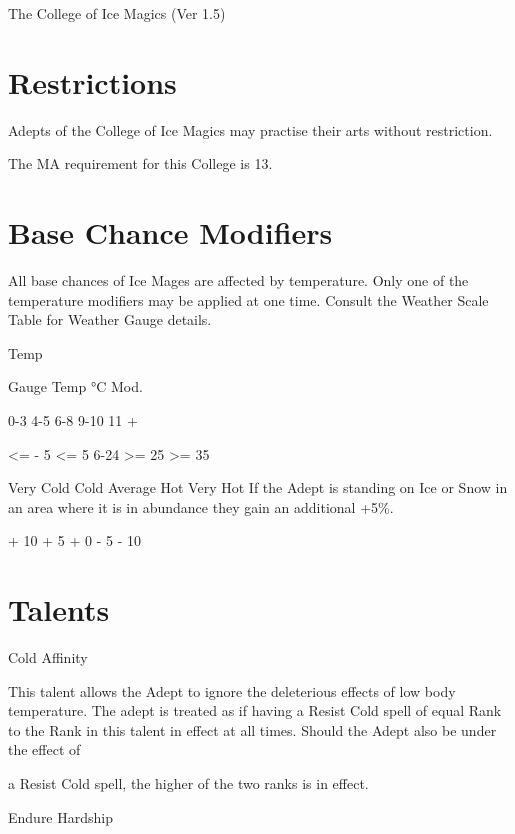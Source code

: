 \begin{Chapter}{The College of Ice Magics (Ver 1.5)}
\section{Restrictions}

Adepts  of  the  College  of  Ice  Magics  may  practise 
their arts without restriction. 

The MA requirement for this College is 13. 


\section{Base Chance Modifiers}

All  base  chances  of  Ice  Mages  are  affected  by 
temperature. Only one of the temperature modifiers 
may  be  applied  at  one  time.  Consult  the  Weather 
Scale Table for Weather Gauge details. 

Temp 

Gauge  Temp °C  Mod. 

0-3 
4-5 
6-8 
9-10 
11 + 

<= - 5 
<= 5 
6-24 
>= 25 
>= 35 

Very Cold 
Cold 
Average 
Hot 
Very Hot 
If the Adept is standing on  Ice or Snow in an area 
where  it  is  in  abundance  they  gain  an  additional 
+5\%. 

+ 10 
+ 5 
+ 0 
- 5 
- 10 


\section{Talents}

\begin{talent}[T-1]{Cold Affinity }

\begin{effects}
 This  talent allows  the  Adept  to  ignore  the 
deleterious  effects  of  low  body  temperature.  The 
adept  is  treated  as  if having a Resist Cold  spell  of 
equal Rank to the Rank in this talent in effect at all 
times. Should the Adept also be under the effect of 

a Resist Cold spell, the higher of the two ranks is in 
effect. 

\end{effects}
\end{talent}

\begin{talent}[T-2]{Endure Hardship }


\end{talent}
\end{Chapter}
